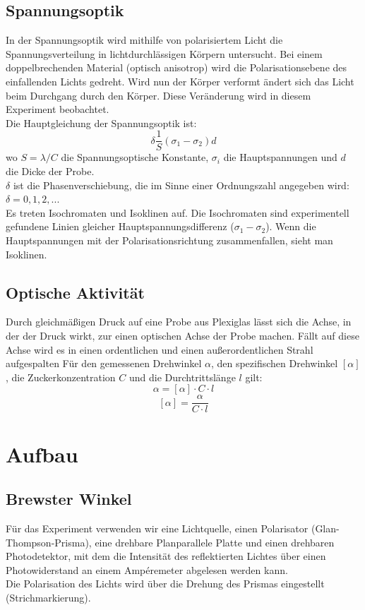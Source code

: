 \documentclass[twoside]{article}
\begin{document}
\subsection{Spannungsoptik}

In der Spannungsoptik wird mithilfe von polarisiertem Licht die Spannungsverteilung in lichtdurchlässigen Körpern untersucht. Bei einem doppelbrechenden Material (optisch anisotrop) wird die Polarisationsebene des einfallenden Lichts gedreht. Wird nun der Körper verformt ändert sich das Licht beim Durchgang durch den Körper. Diese Veränderung wird in diesem Experiment beobachtet.\\
Die Hauptgleichung der Spannungsoptik ist:
$$\delta\frac{1}{S}(\sigma_1 - \sigma_2)d$$
wo $S=\lambda/C$ die Spannungsoptische Konstante, $\sigma_i$ die Hauptspannungen und $d$ die Dicke der Probe. \\
$\delta$ ist die Phasenverschiebung, die im Sinne einer Ordnungszahl angegeben wird: $\delta=0,1,2,...$\\
Es treten Isochromaten und Isoklinen auf. Die Isochromaten sind experimentell gefundene Linien gleicher Hauptspannungsdifferenz ($\sigma_1-\sigma_2$). Wenn die Hauptspannungen mit der Polarisationsrichtung zusammenfallen, sieht man Isoklinen.

\subsection{Optische Aktivität}
Durch gleichmäßigen Druck auf eine Probe aus Plexiglas lässt sich die Achse, in der der Druck wirkt, zur einen optischen Achse der Probe machen. Fällt auf diese Achse wird es in einen ordentlichen und einen außerordentlichen Strahl aufgespalten
Für den gemessenen Drehwinkel $\alpha$, den spezifischen Drehwinkel $[\alpha]$, die Zuckerkonzentration $C$ und die Durchtrittslänge $l$ gilt:
\begin{equation*}
\alpha=[\alpha]\cdot C \cdot l
\end{equation*} 
\begin{equation}
\label{eq:SpezDrehwinkel}
[\alpha]=\frac{\alpha}{ C \cdot l }
\end{equation} 
\section{Aufbau}
\subsection{Brewster Winkel}
Für das Experiment verwenden wir eine Lichtquelle, einen Polarisator (Glan-Thompson-Prisma), eine drehbare Planparallele Platte und einen drehbaren Photodetektor, mit dem die Intensität des reflektierten Lichtes über einen Photowiderstand an einem Ampéremeter abgelesen werden kann.\\
Die Polarisation des Lichts wird über die Drehung des Prismas eingestellt (Strichmarkierung).
\end{document}
